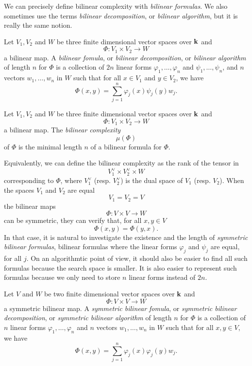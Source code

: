 We can precisely define bilinear complexity with \emph{bilinear formulas}. We
also sometimes use the terms \emph{bilinear decomposition}, or \emph{bilinear
algorithm}, but it is really the same notion.
\begin{defi}
  Let $V_1, V_2$ and $W$ be three finite dimensional vector spaces over $\mathbf{k}$ and 
  \[
    \Phi:V_1\times V_2\to W
  \]
  a bilinear map. A \emph{bilinear fomula}, or \emph{bilinear decomposition}, or
  \emph{bilinear algorithm} of length $n$ for $\Phi$ is a
  collection of $2n$ linear forms $\varphi_1, \dots, \varphi_n$ and $\psi_1,
  \dots, \psi_n$, and $n$ vectors $w_1, \dots, w_n$ in $W$ such that for all
  $x\in V_1$ and $y\in V_2$, we have
  \[
    \Phi(x, y) = \sum_{j=1}^n \varphi_j(x)\psi_j(y)w_j.
  \]
\end{defi}
\begin{defi}
  Let $V_1, V_2$ and $W$ be three finite dimensional vector spaces over $\mathbf{k}$ and 
  \[
    \Phi:V_1\times V_2\to W
  \]
  a bilinear map. The \emph{bilinear complexity} 
  \[
    \mu(\Phi)
  \]
  of $\Phi$ is the minimal length $n$ of a bilinear formula for $\Phi$.
\end{defi}
Equivalently, we can define the bilinear complexity as the rank of the tensor in 
\[
  V_1^\vee \times V_2^\vee \times W
\]
corresponding to $\Phi$, where $V_1^\vee$ (resp. $V_2^\vee$) is the dual space
of $V_1$ (resp. $V_2$). When the spaces $V_1$ and $V_2$ are equal
\[
  V_1 = V_2 = V
\]
the bilinear maps 
\[
  \Phi:V\times V\to W
\]
can be symmetric, \ie they can verify that, for all $x, y\in V$
\[
  \Phi(x, y) = \Phi(y, x).
\]
In that case, it is natural to investigate the existence and the length of
\emph{symmetric bilinear formulas}, \ie bilinear formulas where the linear forms
$\varphi_j$ and $\psi_j$ are equal, for all $j$. On an algorithmtic point of
view, it should also be easier to find all such formulas because the
search space is smaller. It is also easier to represent such formulas because we
only need to store $n$ linear forms instead of $2n$.
\begin{defi}
  \label{def:sym-bil-for}
  Let $V$ and $W$ be two finite dimensional vector spaces over $\mathbf{k}$ and 
  \[
    \Phi:V\times V\to W
  \]
  a symmetric bilinear map. A \emph{symmetric bilinear fomula}, or
  \emph{symmetric bilinear decomposition}, or
  \emph{symmetric bilinear algorithm} of length $n$ for $\Phi$ is a
  collection of $n$ linear forms $\varphi_1, \dots, \varphi_n$
  and $n$ vectors $w_1, \dots, w_n$ in $W$ such that for all
  $x, y\in V$, we have
  \[
    \Phi(x, y) = \sum_{j=1}^n \varphi_j(x)\varphi_j(y)w_j.
  \]
\end{defi}
